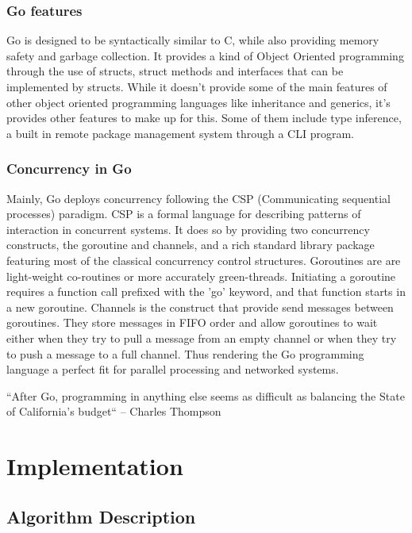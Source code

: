 \documentclass[12pt,a4paper]{report}
\begin{document}
		\subsection{Go features}
		Go is designed to be syntactically similar to 
		C, while also providing memory safety and garbage collection. It provides a kind of Object Oriented programming through the use of structs, struct 
		methods and interfaces that can be implemented by structs. While it doesn't provide some of the main features of other object oriented programming 
		languages like inheritance and generics, it's provides other features to make up for this. Some of them include type inference, a built in remote
		package management system through a CLI program. 
		
		\subsection{Concurrency in Go}
		 Mainly, Go deploys concurrency following the CSP (Communicating sequential processes) paradigm. CSP
		is a formal language for describing patterns of interaction in concurrent systems. It does so by providing two concurrency constructs, the goroutine 
		and channels, and a rich standard library package featuring most of the classical concurrency control structures. Goroutines are are light-weight 
		co-routines or more accurately green-threads. Initiating a goroutine requires a function call prefixed with the 'go' keyword, and that function starts
		in a new goroutine. Channels is the construct that provide send messages between goroutines. They store messages in FIFO order and allow goroutines to
		wait either when they try to pull a message from an empty channel or when they try to push a message to a full channel. Thus rendering the Go
		programming language a perfect fit for parallel processing and networked systems.
		
	``After Go, programming in anything else seems as difficult as balancing the State of California’s budget`` – Charles Thompson
	\newpage
	\chapter{Implementation}
		\section{Algorithm Description}
		
\end{document}
